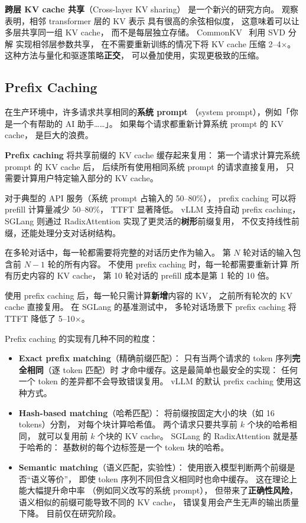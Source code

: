 \textbf{跨层 KV cache 共享}（Cross-layer KV sharing）
是一个新兴的研究方向。
观察表明，相邻 transformer 层的 KV 表示
具有很高的余弦相似度，
这意味着可以让多层共享同一组 KV cache，
而不是每层独立存储。
CommonKV~\cite{wang2025commonkv} 利用 SVD 分解
实现相邻层参数共享，
在不需要重新训练的情况下将 KV cache 压缩 2--4$\times$。
这种方法与量化和驱逐策略\textbf{正交}，
可以叠加使用，实现更极致的压缩。

\subsection{Prefix Caching}

在生产环境中，许多请求共享相同的\textbf{系统 prompt}
（system prompt），例如「你是一个有帮助的 AI 助手……」。
如果每个请求都重新计算系统 prompt 的 KV cache，
是巨大的浪费。

\textbf{Prefix caching} 将共享前缀的 KV cache 缓存起来复用：
第一个请求计算完系统 prompt 的 KV cache 后，
后续所有使用相同系统 prompt 的请求直接复用，
只需要计算用户特定输入部分的 KV cache。

对于典型的 API 服务（系统 prompt 占输入的 50--80\%），
prefix caching 可以将 prefill 计算量减少 50--80\%，
TTFT 显著降低。
vLLM 支持自动 prefix caching，
SGLang 则通过 RadixAttention 实现了更灵活的\textbf{树形}前缀复用，
不仅支持线性前缀，还能处理分支对话树结构。

\begin{whybox}
在多轮对话中，每一轮都需要将完整的对话历史作为输入。
第 $N$ 轮对话的输入包含前 $N-1$ 轮的所有内容。
不使用 prefix caching 时，每一轮都需要重新计算
所有历史内容的 KV cache，
第 10 轮对话的 prefill 成本是第 1 轮的 10 倍。

使用 prefix caching 后，每一轮只需计算\textbf{新增}内容的 KV，
之前所有轮次的 KV cache 直接复用。
在 SGLang 的基准测试中，
多轮对话场景下 prefix caching 将 TTFT 降低了 5--10$\times$。
\end{whybox}

Prefix caching 的实现有几种不同的粒度：
\begin{itemize}[noitemsep]
  \item \textbf{Exact prefix matching}（精确前缀匹配）：
        只有当两个请求的 token 序列\textbf{完全相同}（逐 token 匹配）时
        才命中缓存。这是最简单也最安全的实现：
        任何一个 token 的差异都不会导致错误复用。
        vLLM 的默认 prefix caching 使用这种方式。
  \item \textbf{Hash-based matching}（哈希匹配）：
        将前缀按固定大小的块（如 16 tokens）分割，
        对每个块计算哈希值。
        两个请求只要共享前 $k$ 个块的哈希相同，
        就可以复用前 $k$ 个块的 KV cache。
        SGLang 的 RadixAttention 就是基于哈希的：
        基数树的每个边标签是一个 token 块的哈希。
  \item \textbf{Semantic matching}（语义匹配，实验性）：
        使用嵌入模型判断两个前缀是否“语义等价”，
        即使 token 序列不同但含义相同时也命中缓存。
        这在理论上能大幅提升命中率
        （例如同义改写的系统 prompt），
        但带来了\textbf{正确性风险}，
        语义相似的前缀可能导致不同的 KV cache，
        错误复用会产生无声的输出质量下降。
        目前仅在研究阶段。
\end{itemize}

